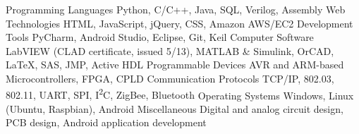 \begin{cvskills}
  \cvskill
    {Programming Languages}
    {Python, C/C++, Java, SQL, Verilog, Assembly}
  \cvskill
    {Web Technologies}
    {HTML, JavaScript, jQuery, CSS, Amazon AWS/EC2}
  \cvskill
    {Development Tools}
    {PyCharm, Android Studio, Eclipse, Git, Keil}
  \cvskill
    {Computer Software}
    {LabVIEW (CLAD certificate, issued 5/13), MATLAB \& Simulink, OrCAD, \LaTeX, SAS, JMP, Active HDL}
  \cvskill
    {Programmable Devices}
    {AVR and ARM-based Microcontrollers, FPGA, CPLD}
  \cvskill
    {Communication Protocols}
    {TCP/IP, 802.03, 802.11, UART, SPI, I\textsuperscript{2}C, ZigBee, Bluetooth}
  \cvskill
    {Operating Systems}
    {Windows, Linux (Ubuntu, Raspbian), Android}
  \cvskill
    {Miscellaneous}
    {Digital and analog circuit design, PCB design, Android application development}
\end{cvskills}